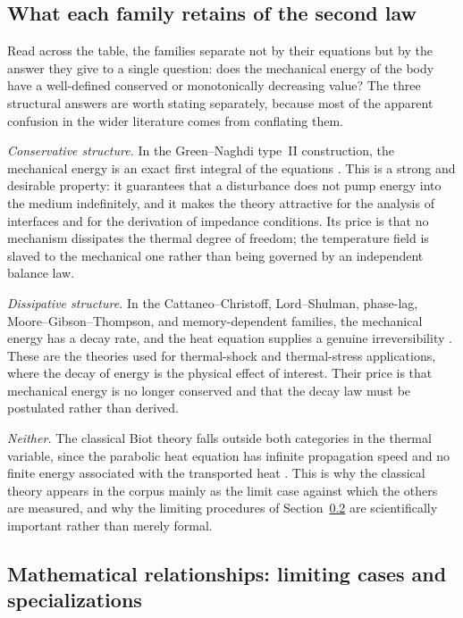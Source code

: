 \subsection{What each family retains of the second law}
\label{sec:12.2}

Read across the table, the families separate not by their equations but by the answer they give to a single question: does the mechanical energy of the body have a well-defined conserved or monotonically decreasing value? The three structural answers are worth stating separately, because most of the apparent confusion in the wider literature comes from conflating them.

\emph{Conservative structure.} In the Green--Naghdi type~II construction, the mechanical energy is an exact first integral of the equations \cite{Green1991}. This is a strong and desirable property: it guarantees that a disturbance does not pump energy into the medium indefinitely, and it makes the theory attractive for the analysis of interfaces and for the derivation of impedance conditions. Its price is that no mechanism dissipates the thermal degree of freedom; the temperature field is slaved to the mechanical one rather than being governed by an independent balance law.

\emph{Dissipative structure.} In the Cattaneo--Christoff, Lord--Shulman, phase-lag, Moore--Gibson--Thompson, and memory-dependent families, the mechanical energy has a decay rate, and the heat equation supplies a genuine irreversibility \cite{Cattaneo1948,Lord1967,Tzou1995,Quintanilla2019,Wang2011}. These are the theories used for thermal-shock and thermal-stress applications, where the decay of energy is the physical effect of interest. Their price is that mechanical energy is no longer conserved and that the decay law must be postulated rather than derived.

\emph{Neither.} The classical Biot theory falls outside both categories in the thermal variable, since the parabolic heat equation has infinite propagation speed and no finite energy associated with the transported heat \cite{Biot1956}. This is why the classical theory appears in the corpus mainly as the limit case against which the others are measured, and why the limiting procedures of Section~\ref{sec:12.3} are scientifically important rather than merely formal.

\subsection{Mathematical relationships: limiting cases and specializations}
\label{sec:12.3}

